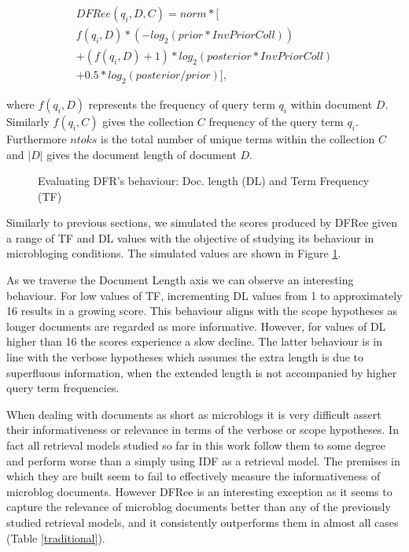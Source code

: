 \begin{multline}
DFRee(q_i,D,C) = norm * [                    \\
f(q_i, D)*(-log_2(prior*InvPriorColl))       \\
+(f(q_i, D)+1)*log_2(posterior*InvPriorColl) \\
+ 0.5*log_2(posterior/prior)],
\end{multline}

where \(f(q_i, D)\) represents the frequency of query term \(q_i\) within document \(D\). Similarly \(f(q_i, C)\) gives the collection \(C\) frequency of the query term \(q_i\). Furthermore \(ntoks\) is the total number of unique terms within the collection \(C\) and \(|D|\) gives the document length of document \(D\).

\begin{figure}
	\centering
	\caption{Evaluating DFR's behaviour: Doc. length (DL) and Term Frequency (TF)}
	
	\label{dfrTFDLcomp}
\end{figure} 

Similarly to previous sections, we simulated the scores produced by DFRee given a range of TF and DL values with the objective of studying its behaviour in microbloging conditions. The simulated values are shown in Figure \ref{dfrTFDLcomp}.

As we traverse the Document Length axis we can observe an interesting behaviour. For low values of TF, incrementing DL values from 1 to approximately 16 results in a growing score. This behaviour aligns with the scope hypotheses as longer documents are regarded as more informative. However, for values of DL higher than 16 the scores experience a slow decline. The latter behaviour is in line with the verbose hypotheses which assumes the extra length is due to superfluous information, when the extended length is not accompanied by higher query term frequencies.

When dealing with documents as short as microblogs it is very difficult assert their informativeness or relevance in terms of the verbose or scope hypotheses. In fact all retrieval models studied so far in this work follow them to some degree and perform worse than a simply using IDF as a retrieval model. The premises in which they are built seem to fail to effectively measure the informativeness of microblog documents. However DFRee is an interesting exception as it seems to capture the relevance of microblog documents better than any of the previously studied retrieval models, and it consistently outperforms them in almost all cases (Table \ref{traditional}).

